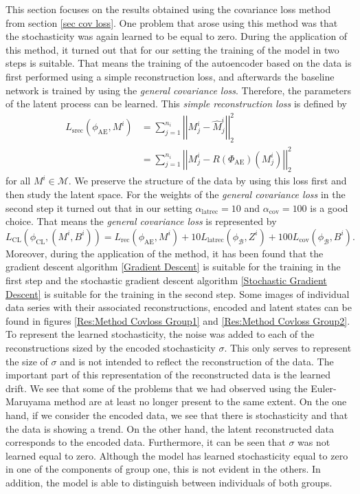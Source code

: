 \documentclass[11pt,titlepage]{article}
\newcommand{\abs}[1]{{\left| #1 \right|}}
\theoremstyle{definition}
\theoremstyle{remark}
\begin{document}
	This section focuses on the results obtained using the covariance loss method from section \ref{sec cov loss}. One problem that arose using this method was that the stochasticity was again learned to be equal to zero. During the application of this method, it turned out that for our setting the training of the model in two steps is suitable. That means the training of the autoencoder based on the data is first performed using a simple reconstruction loss, and afterwards the baseline network is trained by using the \textsl{general covariance loss}. Therefore, the parameters of the latent process can be learned. This \textsl{simple reconstruction loss} is defined by
	\begin{align*}
		L_\mathrm{srec}(\phi_{\mathrm{AE}}, M^i)&=\sum_{j=1}^{n_i}\abs{\abs{M^i_j - \hat{M}^i_j}}_2^2\\
		&= \sum_{j=1}^{n_i}\abs{\abs{M^i_j - R(\Phi_{\mathrm{AE}})(M^i_j)}}_2^2
	\end{align*}
	for all $M^i\in\mathcal{M}$. We preserve the structure of the data by using this loss first and then study the latent space. For the weights of the \textsl{general covariance loss} in the second step it turned out that in our setting $\alpha_\mathrm{latrec}=10$ and $\alpha_\mathrm{cov}=100$ is a good choice. That means the \textsl{general covariance loss} is represented by
	\[L_\mathrm{CL}(\phi_\mathrm{CL}, (M^i, B^i)) = L_\mathrm{rec}(\phi_{\mathrm{AE}}, M^i) + 10 L_\mathrm{latrec}(\phi_\mathcal{B}, Z^i) + 100L_\mathrm{cov}(\phi_\mathcal{B}, B^i).\]
	Moreover, during the application of the method, it has been found that the gradient descent algorithm \ref{Gradient Descent} is suitable for the training in the first step and the stochastic gradient descent algorithm \ref{Stochastic Gradient Descent} is suitable for the training in the second step. 
	Some images of individual data series with their associated reconstructions, encoded and latent states can be found in figures \ref{Res:Method Covloss Group1} and \ref{Res:Method Covloss Group2}. 
	To represent the learned stochasticity, the noise was added to each of the reconstructions sized by the encoded stochasticity $\sigma$. This only serves to represent the size of $\sigma$ and is not intended to reflect the reconstruction of the data. The important part of this representation of the reconstructed data is the learned drift. 
	We see that some of the problems that we had observed using the Euler-Maruyama method are at least no longer present to the same extent. On the one hand, if we consider the encoded data, we see that there is stochasticity and that the data is showing a trend. On the other hand, the latent reconstructed data corresponds to the encoded data. Furthermore, it can be seen that $\sigma$ was not learned equal to zero. Although the model has learned stochasticity equal to zero in one of the components of group one, this is not evident in the others. In addition, the model is able to distinguish between individuals of both groups.
	
\end{document}
